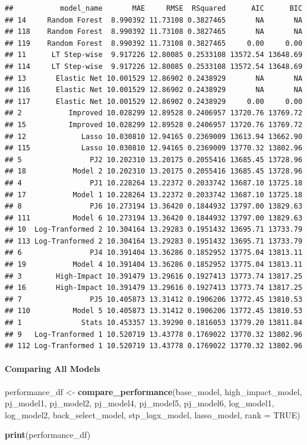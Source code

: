\documentclass[
]{article}
\newenvironment{Shaded}{\begin{snugshade}}{\end{snugshade}}
\newcommand{\AttributeTok}[1]{\textcolor[rgb]{0.13,0.29,0.53}{#1}}
\newcommand{\ConstantTok}[1]{\textcolor[rgb]{0.56,0.35,0.01}{#1}}
\newcommand{\FunctionTok}[1]{\textcolor[rgb]{0.13,0.29,0.53}{\textbf{#1}}}
\newcommand{\NormalTok}[1]{#1}
\newcommand{\OtherTok}[1]{\textcolor[rgb]{0.56,0.35,0.01}{#1}}
\begin{document}
\begin{verbatim}
##           model_name       MAE     RMSE  RSquared      AIC      BIC
## 14     Random Forest  8.990392 11.73108 0.3827465       NA       NA
## 118    Random Forest  8.990392 11.73108 0.3827465       NA       NA
## 119    Random Forest  8.990392 11.73108 0.3827465     0.00     0.00
## 11      LT Step-wise  9.917226 12.80085 0.2533108 13572.54 13648.69
## 114     LT Step-wise  9.917226 12.80085 0.2533108 13572.54 13648.69
## 13       Elastic Net 10.001529 12.86902 0.2438929       NA       NA
## 116      Elastic Net 10.001529 12.86902 0.2438929       NA       NA
## 117      Elastic Net 10.001529 12.86902 0.2438929     0.00     0.00
## 2           Improved 10.028299 12.89528 0.2406957 13720.76 13769.72
## 15          Improved 10.028299 12.89528 0.2406957 13720.76 13769.72
## 12             Lasso 10.030810 12.94165 0.2369009 13613.94 13662.90
## 115            Lasso 10.030810 12.94165 0.2369009 13770.32 13802.96
## 5                PJ2 10.202310 13.20175 0.2055416 13685.45 13728.96
## 18           Model 2 10.202310 13.20175 0.2055416 13685.45 13728.96
## 4                PJ1 10.228264 13.22372 0.2033742 13687.10 13725.18
## 17           Model 1 10.228264 13.22372 0.2033742 13687.10 13725.18
## 8                PJ6 10.273194 13.36420 0.1844932 13797.00 13829.63
## 111          Model 6 10.273194 13.36420 0.1844932 13797.00 13829.63
## 10  Log-Tranformed 2 10.304164 13.29283 0.1951432 13695.71 13733.79
## 113 Log-Tranformed 2 10.304164 13.29283 0.1951432 13695.71 13733.79
## 6                PJ4 10.391404 13.36286 0.1852952 13775.04 13813.11
## 19           Model 4 10.391404 13.36286 0.1852952 13775.04 13813.11
## 3        High-Impact 10.391479 13.29616 0.1927413 13773.74 13817.25
## 16       High-Impact 10.391479 13.29616 0.1927413 13773.74 13817.25
## 7                PJ5 10.405873 13.31412 0.1906206 13772.45 13810.53
## 110          Model 5 10.405873 13.31412 0.1906206 13772.45 13810.53
## 1              Stats 10.453357 13.39290 0.1816053 13779.20 13811.84
## 9   Log-Tranformed 1 10.520719 13.43778 0.1769022 13770.32 13802.96
## 112 Log-Tranformed 1 10.520719 13.43778 0.1769022 13770.32 13802.96
\end{verbatim}

\paragraph{Comparing All Models}\label{comparing-all-models-1}

\begin{Shaded}
\begin{Highlighting}[]
\NormalTok{performance\_df }\OtherTok{\textless{}{-}} \FunctionTok{compare\_performance}\NormalTok{(base\_model, high\_impact\_model, pj\_model1, pj\_model2, pj\_model4, pj\_model5, pj\_model6, log\_model1, log\_model2, back\_select\_model, stp\_logx\_model, lasso\_model,  }\AttributeTok{rank =} \ConstantTok{TRUE}\NormalTok{)}

\FunctionTok{print}\NormalTok{(performance\_df)}
\end{Highlighting}
\end{Shaded}
\end{document}
